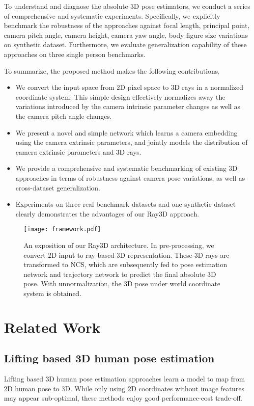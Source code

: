 \documentclass[10pt,twocolumn,letterpaper]{article}
\begin{document}
To understand and diagnose the absolute 3D pose estimators, we conduct a series of comprehensive and systematic experiments. Specifically, we explicitly benchmark the robustness of the approaches against focal length, principal point, camera pitch angle, camera height, camera yaw angle, body figure size variations on synthetic dataset. Furthermore, we evaluate generalization capability of these approaches on three single person benchmarks. 

To summarize, the proposed method makes the following contributions,
\begin{itemize}[noitemsep,nolistsep]
\item We convert the input space from 2D pixel space to 3D rays in a normalized coordinate system. This simple design effectively normalizes away the variations introduced by the camera intrinsic parameter changes as well as the camera pitch angle changes.
\item We present a novel and simple network which learns a camera embedding using the camera extrinsic parameters, and jointly models the distribution of camera extrinsic parameters and 3D rays. 
\item We provide a comprehensive and systematic benchmarking of existing 3D approaches in terms of robustness against camera pose variations, as well as cross-dataset generalization. 
\item Experiments on three real benchmark datasets and one synthetic dataset clearly demonstrates the advantages of our Ray3D approach.
\end{itemize}



\begin{figure*}[tbp]
    \centering
	\texttt{[image: framework.pdf]} 
	\vskip-9pt
	\caption{An exposition of our Ray3D architecture. In pre-processing, we convert 2D input to ray-based 3D representation. These 3D rays are transformed to NCS, which are subsequently fed to pose estimation network and trajectory network to  predict the final absolute 3D pose. With unnormalization, the 3D pose under world coordinate system is obtained.}
	\label{fig:overview}
	\vspace{-6mm}
\end{figure*}

\section{Related Work}

\noindent\subsection{Lifting based 3D human pose estimation} 
Lifting based 3D human pose estimation approaches learn a model to map from 2D human pose to 3D. While only using 2D coordinates without image features may appear sub-optimal, these methods enjoy good performance-cost trade-off.
\end{document}
